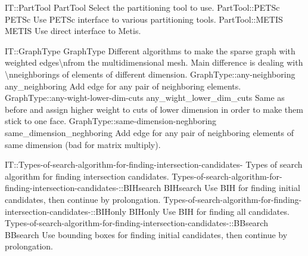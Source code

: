 \begin{SelectionType}
	{IT::PartTool}
	{PartTool}
	{{{Select the partitioning tool to use.}%
}}
		\SelectionItem
			{PartTool::PETSc}
			{PETSc}
			{{{Use PETSc interface to various partitioning tools.}%
}}
		\SelectionItem
			{PartTool::METIS}
			{METIS}
			{{{Use direct interface to Metis.}%
}}
\end{SelectionType}
\begin{SelectionType}
	{IT::GraphType}
	{GraphType}
	{{{Different algorithms to make the sparse graph with weighted edges{\textbackslash}nfrom the multidimensional mesh.
Main difference is dealing with {\textbackslash}nneighborings of elements of different dimension.}%
}}
		\SelectionItem
			{GraphType::any-neighboring}
			{any{\_}neighboring}
			{{{Add edge for any pair of neighboring elements.}%
}}
		\SelectionItem
			{GraphType::any-wight-lower-dim-cuts}
			{any{\_}wight{\_}lower{\_}dim{\_}cuts}
			{{{Same as before and assign higher weight to cuts of lower dimension in order to make them stick to one face.}%
}}
		\SelectionItem
			{GraphType::same-dimension-neghboring}
			{same{\_}dimension{\_}neghboring}
			{{{Add edge for any pair of neighboring elements of same dimension (bad for matrix multiply).}%
}}
\end{SelectionType}
\begin{SelectionType}
	{IT::Types-of-search-algorithm-for-finding-intersection-candidates-}
	{Types of search algorithm for finding intersection candidates.}
	{}
		\SelectionItem
			{Types-of-search-algorithm-for-finding-intersection-candidates-::BIHsearch}
			{BIHsearch}
			{{{Use BIH for finding initial candidates, then continue by prolongation.}%
}}
		\SelectionItem
			{Types-of-search-algorithm-for-finding-intersection-candidates-::BIHonly}
			{BIHonly}
			{{{Use BIH for finding all candidates.}%
}}
		\SelectionItem
			{Types-of-search-algorithm-for-finding-intersection-candidates-::BBsearch}
			{BBsearch}
			{{{Use bounding boxes for finding initial candidates, then continue by prolongation.}%
}}
\end{SelectionType}
